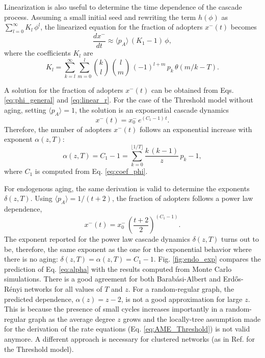 Linearization is also useful to determine the time dependence of the cascade process.  Assuming a small initial seed and rewriting the term $h(\phi)$ as  $ \sum_{l=0}^{\infty} K_l\,  \phi^l $, the linearized equation for the fraction of adopters $x^{-}(t)$ becomes
\begin{equation}
    \label{eq:linear_r}
    \frac{d x^{-}}{dt} \approx  \langle p_A \rangle\,  ( K_1 -1)\, \phi,
\end{equation}
where the coefficients $K_l$ are
\begin{equation}
    \label{eq:coef_rho}
    K_l = \sum_{k=l}^{\infty} \sum_{m=0}^{l} { k \choose l} \, {l \choose m} \, (-1)^{l+m}\,  p_k \, \theta\left( m/k - T \right).
\end{equation}

A solution for the fraction of adopters $x^{-}(t)$ can be obtained from  Eqs. \eqref{eq:phi_general} and \eqref{eq:linear_r}.  For the case of the Threshold model without aging, setting $\langle p_A \rangle = 1$,  the solution is an exponential cascade dynamics
\begin{equation}
    x^{-}(t) = x^{-}_{0} \, e^{(C_1 - 1)\, t}.
\end{equation}
Therefore, the number of adopters $x^{-} (t)$ follows an exponential increase with exponent $\alpha(z,T)$:
\begin{equation}
    \label{eq:alpha}
    \alpha(z,T) = C_1 - 1 = \sum_{k=0}^{\lfloor 1/T \rfloor} \frac{k \, (k - 1)}{z}\, p_k - 1,
\end{equation}
where $C_1$ is computed from Eq. \eqref{eq:coef_phi}. 

For endogenous aging, the same derivation is valid to determine the exponents $\delta(z,T)$. Using $\langle p_A \rangle = 1/(t+2)$, the fraction of adopters follows a power law dependence,
\begin{equation}
    \label{rho_endo}
    x^{-}(t) = x^{-}_{0} \, \left( \frac{t+2}{2} \right)^{(C_1 - 1)}.
\end{equation}
The exponent reported for the power law cascade dynamics $\delta(z,T)$ turns out to be, therefore, the same exponent as the one for the exponential behavior where there is no aging:  $\delta(z,T)= \alpha(z,T)= C_{1} - 1$. Fig. \ref{fig:endo_exp} compares the prediction of Eq. \eqref{eq:alpha} with the results computed from Monte Carlo simulations. There is a good agreement for both Barab\'asi-Albert and Erd\H{o}s-R\'enyi networks for all values of $T$ and $z$. For a random-regular graph, the predicted dependence, $\alpha(z) = z - 2$, is not a good approximation for large $z$. This is because the presence of small cycles increases importantly in a random-regular graph as the average degree $z$ grows \cite{wormald_1999} and the locally-tree assumption made for the derivation of the rate equations (Eq. \eqref{eq:AME_Threshold}) is not valid anymore. A different approach is necessary for clustered networks (as in Ref.\cite{Leah2022} for the Threshold model).

